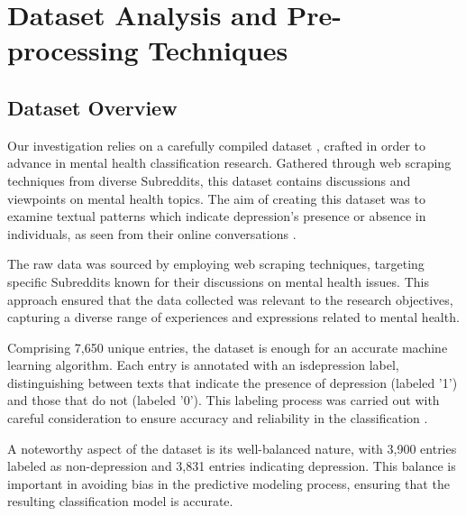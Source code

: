 \chapter{Dataset Analysis and Pre-processing Techniques}
\label{chap:ch1}

\par
\section{Dataset Overview}

\quad Our investigation relies on a carefully compiled dataset \cite{depressionDataset}, crafted in order to advance in mental health classification research. Gathered through web scraping techniques from diverse Subreddits, this dataset contains discussions and viewpoints on mental health topics. The aim of creating this dataset was to examine textual patterns which indicate depression's presence or absence in individuals, as seen from their online conversations .

The raw data was sourced by employing web scraping techniques, targeting specific Subreddits known for their discussions on mental health issues. This approach ensured that the data collected was relevant to the research objectives, capturing a diverse range of experiences and expressions related to mental health.

Comprising 7,650 unique entries, the dataset is enough for an accurate machine learning algorithm. Each entry is annotated with an is\textunderscore depression label, distinguishing between texts that indicate the presence of depression (labeled '1') and those that do not (labeled '0'). This labeling process was carried out with careful consideration to ensure accuracy and reliability in the classification \cite{depressionDataset}.

A noteworthy aspect of the dataset is its well-balanced nature, with 3,900 entries labeled as non-depression and 3,831 entries indicating depression. This balance is important in avoiding bias in the predictive modeling process, ensuring that the resulting classification model is accurate.

